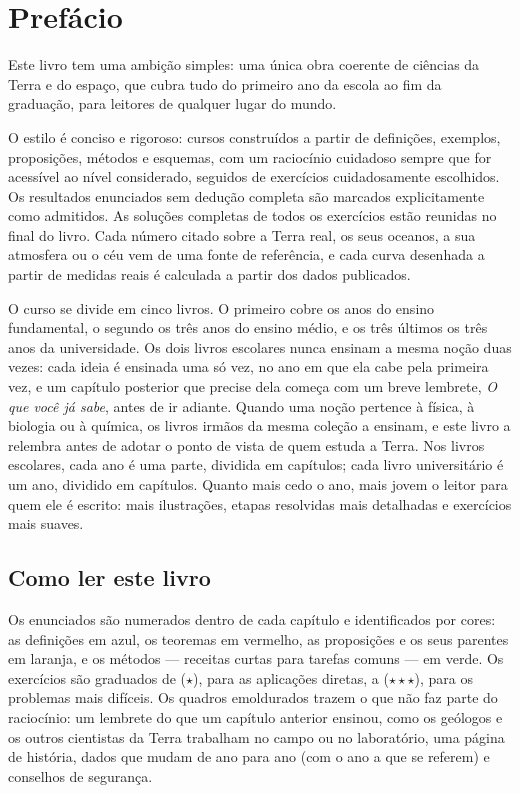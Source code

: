 \chapter{Prefácio}

Este livro tem uma ambição simples: uma única obra coerente de ciências
da Terra e do espaço, que cubra tudo do primeiro ano da escola ao fim da
graduação, para leitores de qualquer lugar do mundo.

O estilo é conciso e rigoroso: cursos construídos a partir de
definições, exemplos, proposições, métodos e esquemas, com um raciocínio
cuidadoso sempre que for acessível ao nível considerado, seguidos de
exercícios cuidadosamente escolhidos. Os resultados enunciados sem
dedução completa são marcados explicitamente como admitidos. As soluções
completas de todos os exercícios estão reunidas no final do livro. Cada
número citado sobre a Terra real, os seus oceanos, a sua atmosfera ou o
céu vem de uma fonte de referência, e cada curva desenhada a partir de
medidas reais é calculada a partir dos dados publicados.

O curso se divide em cinco livros. O primeiro cobre os anos do ensino
fundamental, o segundo os três anos do ensino médio, e os três últimos os
três anos da universidade. Os dois livros escolares nunca ensinam a mesma
noção duas vezes: cada ideia é ensinada uma só vez, no ano em que ela
cabe pela primeira vez, e um capítulo posterior que precise dela começa
com um breve lembrete, \emph{O que você já sabe}, antes de ir adiante.
Quando uma noção pertence à física, à biologia ou à química, os livros
irmãos da mesma coleção a ensinam, e este livro a relembra antes de
adotar o ponto de vista de quem estuda a Terra. Nos livros escolares, cada
ano é uma parte, dividida em capítulos; cada livro universitário é um
ano, dividido em capítulos. Quanto mais cedo o ano, mais jovem o leitor
para quem ele é escrito: mais ilustrações, etapas resolvidas mais
detalhadas e exercícios mais suaves.

\section*{Como ler este livro}

Os enunciados são numerados dentro de cada capítulo e identificados por
cores: as definições em azul, os teoremas em vermelho, as proposições e os
seus parentes em laranja, e os métodos --- receitas curtas para tarefas
comuns --- em verde. Os exercícios são graduados de ($\star$), para as
aplicações diretas, a ($\star\star\star$), para os problemas mais
difíceis. Os quadros emoldurados trazem o que não faz parte do raciocínio:
um lembrete do que um capítulo anterior ensinou, como os geólogos e os
outros cientistas da Terra trabalham no campo ou no laboratório, uma
página de história, dados que mudam de ano para ano (com o ano a que se
referem) e conselhos de segurança.

